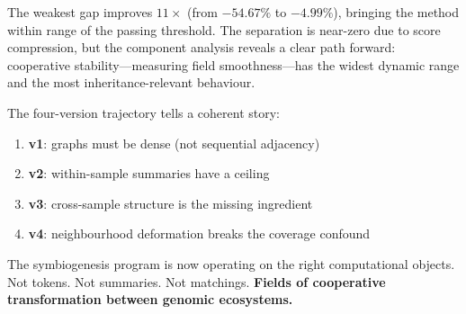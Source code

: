 \documentclass{../yalumba}
\begin{document}

The weakest gap improves $11\times$ (from $-54.67\%$ to $-4.99\%$), bringing
the method within range of the passing threshold.  The separation is near-zero
due to score compression, but the component analysis reveals a clear path
forward: cooperative stability---measuring field smoothness---has the widest
dynamic range and the most inheritance-relevant behaviour.

The four-version trajectory tells a coherent story:

\begin{enumerate}
  \item \textbf{v1}: graphs must be dense (not sequential adjacency)
  \item \textbf{v2}: within-sample summaries have a ceiling
  \item \textbf{v3}: cross-sample structure is the missing ingredient
  \item \textbf{v4}: neighbourhood deformation breaks the coverage confound
\end{enumerate}

The symbiogenesis program is now operating on the right computational
objects.  Not tokens.  Not summaries.  Not matchings.  \textbf{Fields of
cooperative transformation between genomic ecosystems.}




\end{document}
